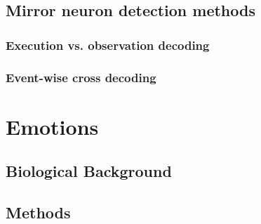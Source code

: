 \documentclass[a4,12pt]{ozu-thesis}
\begin{document}
\section{Mirror neuron detection methods}
\subsection{Execution vs. observation decoding}


\subsection{Event-wise cross decoding}


%
%


\chapter{Emotions}


%

\section{Biological Background}


\section{Methods}

\end{document}
